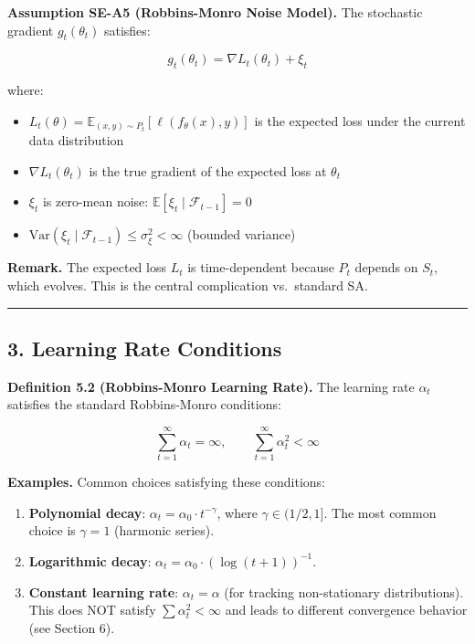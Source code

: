 \documentclass[
  12pt,
]{article}
\providecommand{\tightlist}{%
  \setlength{\itemsep}{0pt}\setlength{\parskip}{0pt}}
\begin{document}
\textbf{Assumption SE-A5 (Robbins-Monro Noise Model).} The stochastic
gradient \(g_t(\theta_t)\) satisfies:

\[
g_t(\theta_t) = \nabla L_t(\theta_t) + \xi_t
\]

where:

\begin{itemize}
\tightlist
\item
  \(L_t(\theta) = \mathbb{E}_{(x,y) \sim P_t}[\ell(f_\theta(x), y)]\) is
  the expected loss under the current data distribution
\item
  \(\nabla L_t(\theta_t)\) is the true gradient of the expected loss at
  \(\theta_t\)
\item
  \(\xi_t\) is zero-mean noise:
  \(\mathbb{E}[\xi_t \mid \mathcal{F}_{t-1}] = 0\)
\item
  \(\text{Var}(\xi_t \mid \mathcal{F}_{t-1}) \leq \sigma^2_\xi < \infty\)
  (bounded variance)
\end{itemize}

\textbf{Remark.} The expected loss \(L_t\) is time-dependent because
\(P_t\) depends on \(S_t\), which evolves. This is the central
complication vs.~standard SA.

\begin{center}\rule{0.5\linewidth}{0.5pt}\end{center}

\subsection{3. Learning Rate Conditions}\label{learning-rate-conditions}

\textbf{Definition 5.2 (Robbins-Monro Learning Rate).} The learning rate
\(\alpha_t\) satisfies the standard Robbins-Monro conditions:

\[
\sum_{t=1}^\infty \alpha_t = \infty, \qquad \sum_{t=1}^\infty \alpha_t^2 < \infty
\]

\textbf{Examples.} Common choices satisfying these conditions:

\begin{enumerate}
\def\labelenumi{\arabic{enumi}.}
\item
  \textbf{Polynomial decay}: \(\alpha_t = \alpha_0 \cdot t^{-\gamma}\),
  where \(\gamma \in (1/2, 1]\). The most common choice is
  \(\gamma = 1\) (harmonic series).
\item
  \textbf{Logarithmic decay}:
  \(\alpha_t = \alpha_0 \cdot (\log(t+1))^{-1}\).
\item
  \textbf{Constant learning rate}: \(\alpha_t = \alpha\) (for tracking
  non-stationary distributions). This does NOT satisfy
  \(\sum \alpha_t^2 < \infty\) and leads to different convergence
  behavior (see Section 6).
\end{enumerate}
\end{document}
